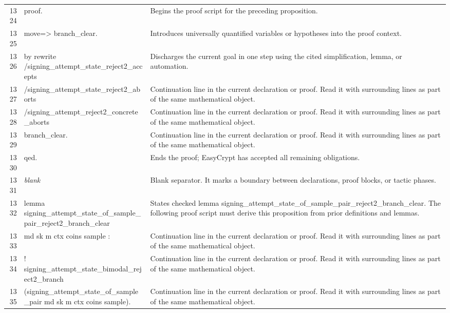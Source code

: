 \documentclass[10pt]{article}
\begin{document}
\begin{longtable}{r L{0.53\textwidth} L{0.37\textwidth}}
1324 & {\ttfamily\scriptsize proof.} & Begins the proof script for the preceding proposition. \\
1325 & {\ttfamily\scriptsize move=> branch\_clear.} & Introduces universally quantified variables or hypotheses into the proof context. \\
1326 & {\ttfamily\scriptsize by rewrite /signing\_attempt\_state\_reject2\_accepts} & Discharges the current goal in one step using the cited simplification, lemma, or automation. \\
1327 & {\ttfamily\scriptsize            /signing\_attempt\_state\_reject2\_aborts} & Continuation line in the current declaration or proof.  Read it with surrounding lines as part of the same mathematical object. \\
1328 & {\ttfamily\scriptsize            /signing\_attempt\_reject2\_concrete\_aborts} & Continuation line in the current declaration or proof.  Read it with surrounding lines as part of the same mathematical object. \\
1329 & {\ttfamily\scriptsize            branch\_clear.} & Continuation line in the current declaration or proof.  Read it with surrounding lines as part of the same mathematical object. \\
1330 & {\ttfamily\scriptsize qed.} & Ends the proof; EasyCrypt has accepted all remaining obligations. \\
1331 & {\ttfamily\scriptsize \emph{blank}} & Blank separator.  It marks a boundary between declarations, proof blocks, or tactic phases. \\
1332 & {\ttfamily\scriptsize lemma signing\_attempt\_state\_of\_sample\_pair\_reject2\_branch\_clear} & States checked lemma signing\_attempt\_state\_of\_sample\_pair\_reject2\_branch\_clear.  The following proof script must derive this proposition from prior definitions and lemmas. \\
1333 & {\ttfamily\scriptsize    md sk m ctx coins sample :} & Continuation line in the current declaration or proof.  Read it with surrounding lines as part of the same mathematical object. \\
1334 & {\ttfamily\scriptsize   ! signing\_attempt\_state\_bimodal\_reject2\_branch} & Continuation line in the current declaration or proof.  Read it with surrounding lines as part of the same mathematical object. \\
1335 & {\ttfamily\scriptsize       (signing\_attempt\_state\_of\_sample\_pair md sk m ctx coins sample).} & Continuation line in the current declaration or proof.  Read it with surrounding lines as part of the same mathematical object. \\

\end{longtable}
\end{document}
